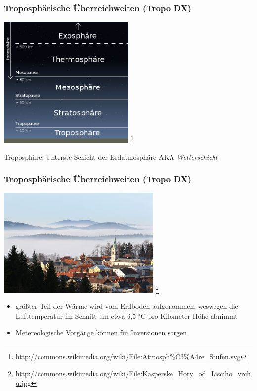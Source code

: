 \begin{frame}
    \frametitle{Troposphärische Überreichweiten (Tropo DX)}

    \begin{center}
        \includegraphics[width=0.5\textwidth]{bv11/Atmosphaere_Stufen.png}
        \footnote{\tiny \url{http://commons.wikimedia.org/wiki/File:Atmosph\%C3\%A4re_Stufen.svg}}
    \end{center}

    Troposphäre: Unterste Schicht der Erdatmosphäre AKA \emph{Wetterschicht}

\end{frame}

\begin{frame}
    \frametitle{Troposphärische Überreichweiten (Tropo DX)}

    \begin{center}
        \includegraphics[width=0.6\textwidth]{bv11/Inversionswetterlage.jpg}
        \footnote{\tiny \url{http://commons.wikimedia.org/wiki/File:Kasperske_Hory_od_Lisciho_vrchu.jpg}}
    \end{center}

    \begin{itemize}
        \item größter Teil der Wärme wird vom Erdboden aufgenommen, weswegen die
              Lufttemperatur im Schnitt um etwa 6,5 $^\circ$C pro Kilometer Höhe abnimmt
        \item Metereologische Vorgänge können für Inversionen sorgen
    \end{itemize}

\end{frame}

